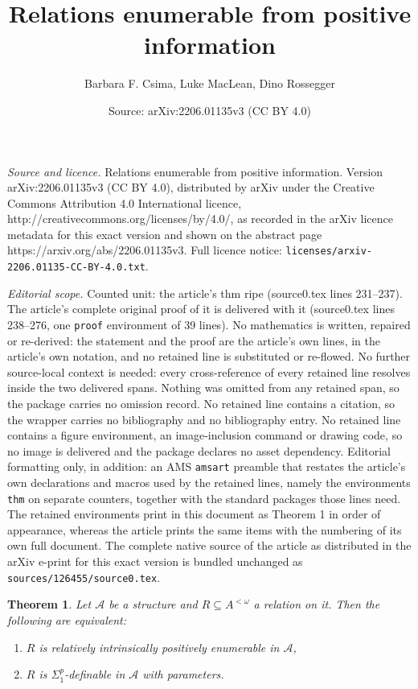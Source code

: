 \documentclass[10pt,a4paper]{amsart}
\title{Relations enumerable from positive information}
\author{Barbara F. Csima, Luke MacLean, Dino Rossegger}
\date{Source: arXiv:2206.01135v3 (CC BY 4.0)}
\newtheorem{thm}{Theorem}
\newcommand{\A}{{\mathcal{A}}}
\providecommand{\tightlist}{%
  \setlength{\itemsep}{0 pt}\setlength{\parskip}{0 pt}}
\begin{document}
\maketitle

\noindent\emph{Source and licence.} Relations enumerable from positive information. Version arXiv:2206.01135v3 (CC BY 4.0), distributed by arXiv under the Creative Commons Attribution 4.0 International licence, http://creativecommons.org/licenses/by/4.0/, as recorded in the arXiv licence metadata for this exact version and shown on the abstract page https://arxiv.org/abs/2206.01135v3. Full licence notice: \texttt{licenses/arxiv-2206.01135-CC-BY-4.0.txt}.\par\smallskip

\noindent\textit{Editorial scope.} Counted unit: the article's thm ripe (source0.tex lines 231--237). The article's complete original proof of it is delivered with it (source0.tex lines 238--276, one \texttt{proof} environment of 39 lines). No mathematics is written, repaired or re-derived: the statement and the proof are the article's own lines, in the article's own notation, and no retained line is substituted or re-flowed.  No further source-local context is needed: every cross-reference of every retained line resolves inside the two delivered spans.  Nothing was omitted from any retained span, so the package carries no omission record.  No retained line contains a citation, so the wrapper carries no bibliography and no bibliography entry.  No retained line contains a figure environment, an image-inclusion command or drawing code, so no image is delivered and the package declares no asset dependency.  Editorial formatting only, in addition: an AMS \texttt{amsart} preamble that restates the article's own declarations and macros used by the retained lines, namely the environments \texttt{thm} on separate counters, together with the standard packages those lines need.  The retained environments print in this document as Theorem 1 in order of appearance, whereas the article prints the same items with the numbering of its own full document.  The complete native source of the article as distributed in the arXiv e-print for this exact version is bundled unchanged as \texttt{sources/126455/source0.tex}.
\begin{thm}\label{ripe}
    Let $\A$ be a structure and $R \subseteq A^{< \omega}$ a relation on it. Then the following are equivalent:
    \begin{enumerate}\tightlist
        \item[(i)] $R$ is relatively intrinsically positively enumerable in $\A$,
        \item[(ii)] $R$ is $\Sigma^p_1$-definable in $\A$ with parameters.
    \end{enumerate}
\end{thm}
\end{document}
